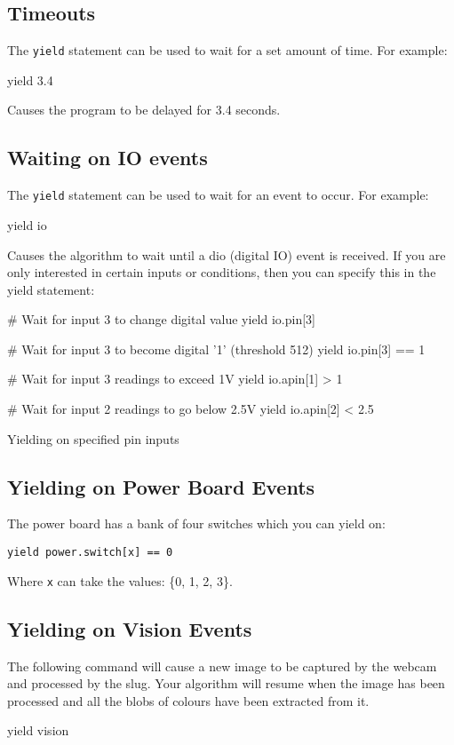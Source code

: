 \documentclass[a4paper, 12pt]{article}
\begin{document}
\subsection{Timeouts}
The \texttt{yield} statement can be used to wait for a set amount of
time.  For example:

\begin{verbatimtab}
yield 3.4
\end{verbatimtab}

Causes the program to be delayed for 3.4 seconds.

\subsection{Waiting on IO events}
The \texttt{yield} statement can be used to wait for an event to
occur.  For example:

\begin{verbatimtab}
yield io
\end{verbatimtab}

Causes the algorithm to wait until a dio (digital IO) event is received. If you are only interested in certain inputs or conditions, then you can specify this in the yield statement:
\begin{python}
\begin{verbatimtab}
# Wait for input 3 to change digital value
yield io.pin[3]
        
# Wait for input 3 to become digital '1' (threshold 512)
yield io.pin[3] == 1
        
# Wait for input 3 readings to exceed 1V
yield io.apin[1] > 1
        
# Wait for input 2 readings to go below 2.5V
yield io.apin[2] < 2.5
\end{verbatimtab} 
\caption{\label{py:yieldio}Yielding on specified pin inputs}
\end{python}


\subsection{Yielding on Power Board Events}
The power board has a bank of four switches which you can yield on:
\begin{verbatim}
yield power.switch[x] == 0
\end{verbatim}
Where \texttt{x} can take the values: \{0, 1, 2, 3\}.


\subsection{Yielding on Vision Events}
The following command will cause a new image to be captured by the webcam and processed by the slug. Your algorithm will resume when the image has been processed and all the blobs of colours have been extracted from it.
\begin{verbatimtab}
yield vision
\end{verbatimtab}
\end{document}
